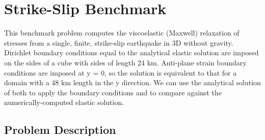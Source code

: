 
\section{Strike-Slip Benchmark}
\label{sec:benchmarks:strikeslip}

This benchmark problem computes the viscoelastic (Maxwell) relaxation
of stresses from a single, finite, strike-slip earthquake in 3D without
gravity.  Dirichlet boundary conditions equal to the analytical elastic
solution are imposed on the sides of a cube with sides of length 24
km. Anti-plane strain boundary conditions are imposed at y = 0, so
the solution is equivalent to that for a domain with a 48 km length
in the y direction. We can use the analytical solution of \cite{Okada:1992}
both to apply the boundary conditions and to compare against the numerically-computed
elastic solution.

\subsection{Problem Description}

